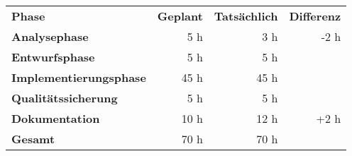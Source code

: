 \begin{tabular}{lrrr}
\rowcolor{heading}\textbf{Phase} & \textbf{Geplant} & \textbf{Tatsächlich} & \textbf{Differenz} \\
\textbf{Analysephase} & 5 h   & 3 h  & -2 h \\
\rowcolor{odd}\textbf{Entwurfsphase} & 5 h  & 5 h  &  \\
\textbf{Implementierungsphase} & 45 h  & 45 h  &  \\
\rowcolor{odd}\textbf{Qualitätssicherung} & 5 h   & 5 h   &  \\
\textbf{Dokumentation} & 10 h   & 12 h  & +2 h \\
\hline
\hline
\rowcolor{odd}\textbf{Gesamt} & 70 h  & 70 h  &  \\
\end{tabular}
